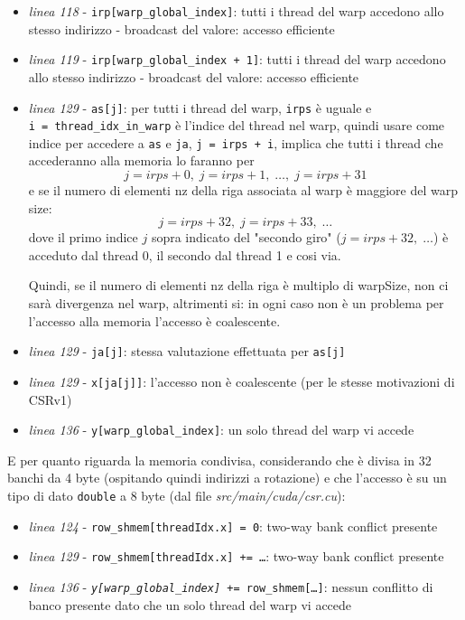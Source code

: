 \documentclass[a4paper,9pt]{extarticle}
\begin{document}
\begin{itemize}
	\item \textit{linea 118} - \texttt{irp[warp\_global\_index]}: tutti i thread del warp accedono allo stesso indirizzo - broadcast del valore: accesso efficiente
	\item \textit{linea 119} - \texttt{irp[warp\_global\_index + 1]}: tutti i thread del warp accedono allo stesso indirizzo - broadcast del valore: accesso efficiente
	\item \textit{linea 129} - \texttt{as[j]}: per tutti i thread del warp, \texttt{irps} è uguale e \\\texttt{i = thread\_idx\_in\_warp} è l'indice del thread nel
	warp, quindi usare come indice per accedere a \texttt{as} e \texttt{ja}, \texttt{j = irps + i}, implica che tutti i thread che accederanno alla memoria lo faranno per
	$$j = irps + 0,\;j = irps + 1,\;\dots,\;j = irps + 31$$
	e se il numero di elementi nz della riga associata al warp è maggiore del warp size:
	$$j = irps + 32,\;j = irps + 33,\;\dots$$
	dove il primo indice $j$ sopra indicato del "secondo giro" ($j = irps + 32,\;\dots$)
	è acceduto dal thread 0, il secondo dal thread 1 e cosi via.
	
	Quindi, se il numero di elementi nz della riga è multiplo di warpSize, non ci sarà
	divergenza nel warp, altrimenti si: in ogni caso non è un problema per l'accesso alla memoria
	l'accesso è coalescente.
	\item \textit{linea 129} - \texttt{ja[j]}: stessa valutazione effettuata per \texttt{as[j]}
	\item \textit{linea 129} - \texttt{x[ja[j]]}: l'accesso non è coalescente (per le stesse
	motivazioni di CSRv1)
	\item \textit{linea 136} - \texttt{y[warp\_global\_index]}: un solo thread del warp vi accede
\end{itemize}

E per quanto riguarda la memoria condivisa, considerando che è divisa in 32 banchi da 4 byte (ospitando quindi indirizzi
a rotazione) e che l'accesso è su un tipo di dato \texttt{double} a 8 byte (dal file \textit{src/main/cuda/csr.cu}):

\begin{itemize}
	\item \textit{linea 124} - \texttt{row\_shmem[threadIdx.x] = 0}: two-way bank conflict presente
	\item \textit{linea 129} - \texttt{row\_shmem[threadIdx.x] += \dots}: two-way bank conflict presente
	\item \textit{linea 136} - \texttt{\textit{y[warp\_global\_index]} += row\_shmem[\dots]}: nessun conflitto di banco presente dato che un
	solo thread del warp vi accede
\end{itemize}
\end{document}
